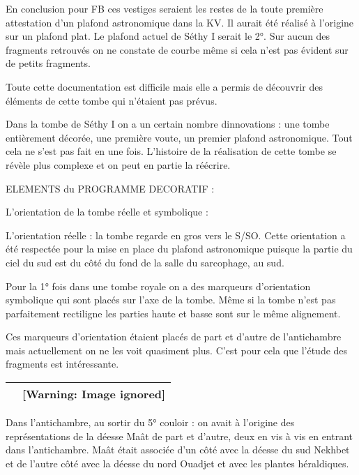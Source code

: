 \documentclass{article}
\begin{document}
En conclusion pour FB ces vestiges seraient les restes de la toute
première attestation d’un plafond astronomique dans la KV. Il aurait
été réalisé à l’origine sur un plafond plat. Le plafond actuel de Séthy
I serait le 2°. Sur aucun des fragments retrouvés on ne constate de
courbe même si cela n’est pas évident sur de petits fragments.

Toute cette documentation est difficile mais elle a permis de découvrir
des éléments de cette tombe qui n’étaient pas prévus.

Dans la tombe de Séthy I on a un certain nombre
d{\textquotesingle}innovations : une tombe entièrement décorée, une
première voute, un premier plafond astronomique. Tout cela ne s’est pas
fait en une fois. L’histoire de la réalisation de cette tombe se révèle
plus complexe et on peut en partie la réécrire.  

ELEMENTS du PROGRAMME DECORATIF : 

L’orientation de la tombe  réelle et symbolique : 

L’orientation réelle : la tombe regarde en gros vers le S/SO. Cette
orientation a été respectée pour la mise en place du plafond
astronomique puisque la partie du ciel du sud est du côté du fond de la
salle du sarcophage, au sud. 

Pour la 1° fois dans une tombe royale on a des marqueurs d’orientation
symbolique qui sont placés sur l’axe de la tombe. Même si la tombe
n’est pas parfaitement rectiligne les parties haute et basse sont sur
le même alignement.

Ces marqueurs d’orientation étaient placés de part et d’autre de
l’antichambre mais actuellement on ne les voit quasiment plus. C’est
pour cela que l’étude des fragments est intéressante.

\begin{flushleft}
\tablehead{}
\begin{supertabular}{|l|l|}
  &   [Warning: Image ignored] %
 \\\hline
\end{supertabular}
\end{flushleft}
Dans l’antichambre, au sortir du 5° couloir : on avait à l’origine des
représentations de la déesse Maât de part et d’autre, deux en vis à vis
en entrant dans l’antichambre. Maât était associée d’un côté avec la
déesse du sud Nekhbet et de l’autre côté avec la déesse du nord Ouadjet
et avec les plantes héraldiques.
\end{document}
